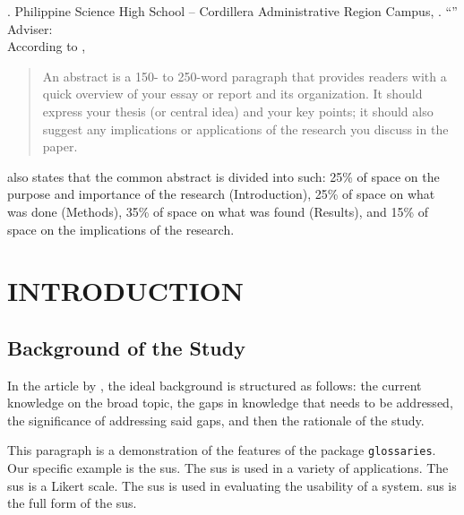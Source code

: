 \documentclass{strrespaper-trad}
\makeatletter
\renewcommand{\makeabstract}[1]{
	{\bfseries\printauthors}. Philippine Science High School -- Cordillera Administrative Region Campus, \ctuline{\@date}. \enquote{\MakeTextUppercase{\@title}} \\[2\baselineskip]
	Adviser: {\bf \the\adviser}	\\
	#1
}
\makeatother
\begin{document}
		\makeabstract{
			According to \textcite{georgemasonuniversityWritingAbstract2020}, \blockquote{An abstract is a 150- to 250-word paragraph that provides readers with a quick overview of your essay or report and its organization. It should express your thesis (or central idea) and your key points; it should also suggest any implications or applications of the research you discuss in the paper.}
			\textcite{georgemasonuniversityWritingAbstract2020} also states that the common abstract is divided into such: 25\% of space on the purpose and importance of the research (Introduction), 25\% of space on what was done (Methods), 35\% of space on what was found (Results), and 15\% of space on the implications of the research.
		}

		\contents
		\listoflistings

	\mainmatter

	\chapter{INTRODUCTION}
		\section{Background of the Study}

			In the article  by \citeauthor{sachdevHowWriteBackground2018}, the ideal background is structured as follows: the current knowledge on the broad topic, the gaps in knowledge that needs to be addressed, the significance of addressing said gaps, and then the rationale of the study.

			This paragraph is a demonstration of the features of the package \texttt{glossaries}.
			Our specific example is the \acs{sus}.
			The \ac{sus} is used in a variety of applications.
			The \ac{sus} is a Likert scale.
			The \acl{sus} is used in evaluating the usability of a system.
			\Acf{sus} is the full form of the \ac{sus}.
\end{document}

